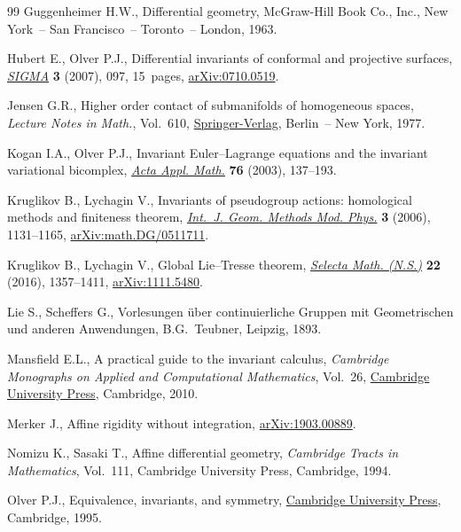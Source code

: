 \begin{thebibliography}{99}
Guggenheimer H.W., Differential geometry, McGraw-Hill Book Co., Inc., New
 York~-- San Francisco~-- Toronto~-- London, 1963.

Hubert E., Olver P.J., Differential invariants of conformal and projective
 surfaces, \href{https://doi.org/10.3842/SIGMA.2007.097}{\textit{SIGMA}} \textbf{3} (2007), 097, 15~pages,
 \href{https://arxiv.org/abs/0710.0519}{arXiv:0710.0519}.

Jensen G.R., Higher order contact of submanifolds of homogeneous spaces,
 \textit{Lecture Notes in Math.}, Vol.~610, \href{https://doi.org/10.1007/BFb0068415}{Springer-Verlag}, Berlin~-- New
 York, 1977.

Kogan I.A., Olver P.J., Invariant {E}uler--{L}agrange equations and the
 invariant variational bicomplex, \href{https://doi.org/10.1023/A:1022993616247}{\textit{Acta Appl. Math.}} \textbf{76}
 (2003), 137--193.

Kruglikov B., Lychagin V., Invariants of pseudogroup actions: homological
 methods and finiteness theorem, \href{https://doi.org/10.1142/S0219887806001478}{\textit{Int.~J. Geom. Methods Mod. Phys.}}
 \textbf{3} (2006), 1131--1165, \href{https://arxiv.org/abs/math.DG/0511711}{arXiv:math.DG/0511711}.

Kruglikov B., Lychagin V., Global {L}ie--{T}resse theorem, \href{https://doi.org/10.1007/s00029-015-0220-z}{\textit{Selecta
 Math. (N.S.)}} \textbf{22} (2016), 1357--1411, \href{https://arxiv.org/abs/1111.5480}{arXiv:1111.5480}.

Lie S., Scheffers G., Vorlesungen \"uber continuierliche {G}ruppen mit
 {G}eometrischen und anderen {A}nwendungen, B.G.~Teubner, Leipzig, 1893.

Mansfield E.L., A practical guide to the invariant calculus, \textit{Cambridge
 Monographs on Applied and Computational Mathematics}, Vol.~26, \href{https://doi.org/10.1017/CBO9780511844621}{Cambridge
 University Press}, Cambridge, 2010.

Merker J., Affine rigidity without integration, \href{https://arxiv.org/abs/1903.00889}{arXiv:1903.00889}.

Nomizu K., Sasaki T., Affine differential geometry, \textit{Cambridge Tracts in
 Mathematics}, Vol.~111, Cambridge University Press, Cambridge, 1994.

Olver P.J., Equivalence, invariants, and symmetry, \href{https://doi.org/10.1017/CBO9780511609565}{Cambridge University Press},
 Cambridge, 1995.


\end{thebibliography}
